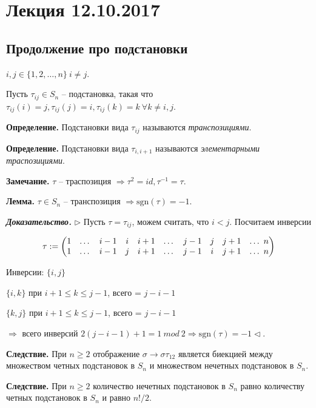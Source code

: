 \section{Лекция 12.10.2017}

\subsection{Продолжение про подстановки}

$i, j \in \{1, 2, \dots, n\} \ i \neq j$.

\bigskip
Пусть $\tau_{ij} \in S_n$ -- подстановка, такая что $\tau_{ij}(i) = j, \tau_{ij}(j) = i, \tau_{ij}(k) = k \ \forall k \neq i,j$.

\bigskip
\textbf{Определение.} Подстановки вида $\tau_{ij}$ называются \textit{транспозициями}.

\bigskip
\textbf{Определение.} Подстановки вида $\tau_{i, i+1}$ называются \textit{элементарными траспозициями}.

\bigskip
\textbf{Замечание.} $\tau$ -- траспозиция $\Rightarrow \tau^2 = id, \tau^{-1} = \tau$.

\bigskip
\textbf{Лемма.} $\tau \in S_n$ -- транспозиция $\Rightarrow \mathrm{sgn}(\tau) = -1$.

\bigskip
\textbf{\textit{Доказательство.}} $\rhd$ Пусть $\tau = \tau_{ij}$, можем считать, что $i < j$. Посчитаем инверсии

\begin{equation*}\tau := \begin{pmatrix} 
	1 & \dots & i-1 & i & i + 1 & \dots & 
	j - 1 & j & j + 1 & \dots \ n
	\cr 
	1 & \dots & i-1 & j & i + 1 & \dots & 
	j - 1 & i & j + 1 & \dots \ n
\end{pmatrix}\end{equation*}

Инверсии: $\{i, j\}$

$\{i, k\}$ при $i + 1 \leq k \leq j -1$, всего =  $j-i-1$

$\{k, j\}$ при $i + 1 \leq k \leq j -1$, всего =  $j-i-1$

$\Rightarrow$ всего инверсий $2(j-i-1) + 1 = 1 \ mod \ 2 \Rightarrow \mathrm{sgn}(\tau) = -1 \lhd$.

\bigskip
\textbf{Следствие.} При $n \geq 2$ отображение $\sigma \rightarrow \sigma \tau_{12}$ является биекцией между множеством четных подстановок в $S_n$ и множеством нечетных подстановок в $S_n$.

\bigskip
\textbf{Следствие.} При $n \geq 2$ количество нечетных подстановок в $S_n$ равно количеству четных подстановок в $S_n$ и равно $n!/2$.

